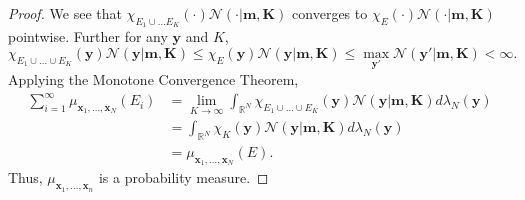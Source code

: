 \begin{proof}
    We see that $\chi_{E_1 \cup \ldots E_K}(\cdot)\mathcal{N}(\cdot | \mathbf{m}, \mathbf{K})$ converges to $\chi_E(\cdot) \mathcal{N}(\cdot | \mathbf{m}, \mathbf{K})$ pointwise.
    Further for any $\mathbf{y}$ and $K$,
    \begin{equation*}
        \chi_{E_1 \cup \ldots \cup E_K}(\mathbf{y}) \mathcal{N}(\mathbf{y} | \mathbf{m}, \mathbf{K})
        \leq
        \chi_E(\mathbf{y}) \mathcal{N}(\mathbf{y} | \mathbf{m}, \mathbf{K})
        \leq \max_{\mathbf{y}'}\mathcal{N}(\mathbf{y'} | \mathbf{m}, \mathbf{K})
        < \infty.
    \end{equation*}
    Applying the Monotone Convergence Theorem,
    \begin{align*}
        \sum_{i = 1}^{\infty} \mu_{\mathbf{x}_1, \ldots, \mathbf{x}_N}(E_i)
        & = \lim_{K \to \infty}\int_{\mathbb{R}^{N}} \chi_{E_1 \cup \ldots \cup E_K}(\mathbf{y})\mathcal{N}(\mathbf{y} | \mathbf{m}, \mathbf{K}) d \lambda_N(\mathbf{y}) \\
        & = \int_{\mathbb{R}^{N}} \chi_{K}(\mathbf{y})\mathcal{N}(\mathbf{y} | \mathbf{m}, \mathbf{K}) d \lambda_N(\mathbf{y}) \\
        & = \mu_{\mathbf{x}_1, \ldots, \mathbf{x}_N}(E).
    \end{align*}
    Thus, $\mu_{\mathbf{x}_1, \ldots, \mathbf{x}_n}$ is a probability measure.


\end{proof}
